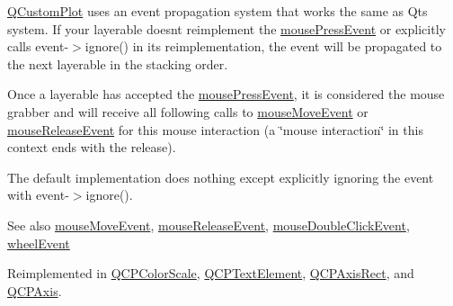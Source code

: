 \hyperlink{classQCustomPlot}{Q\+Custom\+Plot} uses an event propagation system that works the same as Qt\textquotesingle{}s system. If your layerable doesn\textquotesingle{}t reimplement the \hyperlink{classQCPLayerable_af6567604818db90f4fd52822f8bc8376}{mouse\+Press\+Event} or explicitly calls {\ttfamily event-\/$>$ignore()} in its reimplementation, the event will be propagated to the next layerable in the stacking order.

Once a layerable has accepted the \hyperlink{classQCPLayerable_af6567604818db90f4fd52822f8bc8376}{mouse\+Press\+Event}, it is considered the mouse grabber and will receive all following calls to \hyperlink{classQCPLayerable_a9eee1ba47fd69be111059ca3881933e4}{mouse\+Move\+Event} or \hyperlink{classQCPLayerable_aa0d79b005686f668622bbe66ac03ba2c}{mouse\+Release\+Event} for this mouse interaction (a \char`\"{}mouse interaction\char`\"{} in this context ends with the release).

The default implementation does nothing except explicitly ignoring the event with {\ttfamily event-\/$>$ignore()}.

\begin{DoxySeeAlso}{See also}
\hyperlink{classQCPLayerable_a9eee1ba47fd69be111059ca3881933e4}{mouse\+Move\+Event}, \hyperlink{classQCPLayerable_aa0d79b005686f668622bbe66ac03ba2c}{mouse\+Release\+Event}, \hyperlink{classQCPLayerable_a4171e2e823aca242dd0279f00ed2de81}{mouse\+Double\+Click\+Event}, \hyperlink{classQCPLayerable_a47dfd7b8fd99c08ca54e09c362b6f022}{wheel\+Event} 
\end{DoxySeeAlso}


Reimplemented in \hyperlink{classQCPColorScale_a91f633b97ffcd57fdf8cd814974c20e6}{Q\+C\+P\+Color\+Scale}, \hyperlink{classQCPTextElement_ad7b2c98355e3d2f912574b74fcee0574}{Q\+C\+P\+Text\+Element}, \hyperlink{classQCPAxisRect_aa9a7c807eaa4666870ac94aa6abc4dde}{Q\+C\+P\+Axis\+Rect}, and \hyperlink{classQCPAxis_ac89c068873ee9197a5d2af715bdc1105}{Q\+C\+P\+Axis}.

